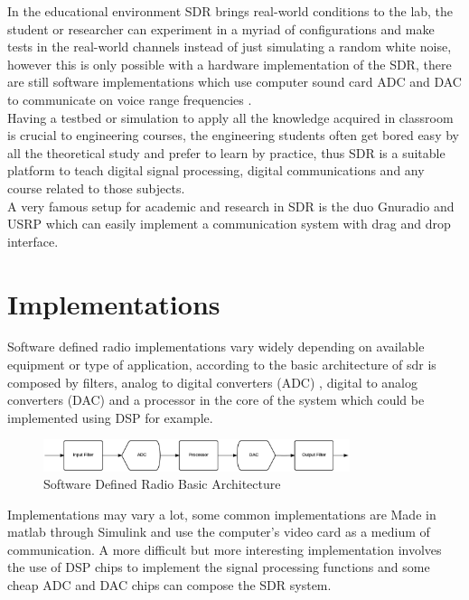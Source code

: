 In the educational environment SDR brings real-world conditions to the lab, the
student or researcher can experiment in a myriad of configurations and make tests
in the real-world channels instead of just simulating a random white noise, however
this is only possible with a hardware implementation of the SDR, there are still
software implementations which use computer sound card ADC and DAC to communicate
on voice range frequencies \cite{ladimer2009}.\\

Having a testbed or simulation to apply all the knowledge acquired in classroom
is crucial to engineering courses, the engineering students often get bored easy
by all the theoretical study and prefer to learn by practice, thus SDR is a
suitable platform to teach digital signal processing, digital communications and
 any course related to those subjects.\\

A very famous setup for academic and research in SDR is the duo Gnuradio \cite{web:gnuradio} and
USRP \cite{web:usrp} which can easily implement a communication system with drag
and drop interface\cite{akbook}.\\


\section{Implementations}

Software defined radio implementations vary widely depending on available equipment
 or type of application, according to \cite{ladimer2009} the basic architecture of sdr is
 composed by filters, analog to digital converters (ADC) , digital to analog
 converters (DAC) and a processor in the core of the system which could be
 implemented using DSP for example.\\

 \begin{figure}[htbp]
     \centering
     \includegraphics[width=0.8\textwidth]{./figures/sdr_basic_arch}
     \caption{ Software Defined Radio Basic Architecture
     \label{fig:sdr_basic}}
 \end{figure}


Implementations may vary a lot, some common implementations are Made in matlab
through Simulink and use the computer’s video card as a medium of communication.
A more difficult but more interesting implementation involves the use of DSP chips
to implement the signal processing functions and some cheap ADC and DAC chips can
compose the SDR system.\\


